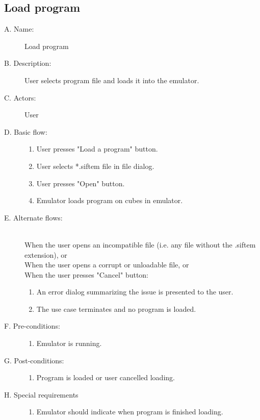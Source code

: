 \documentclass[12pt]{article}
\begin{document}
  \subsection{Load program}

    \begin{description}
      \item[A. Name:] Load program
      \item[B. Description:] User selects program file and loads it into the emulator.
      \item[C. Actors:] User
      \item[D. Basic flow:] \hfill 
        \begin{enumerate}
	  \item{User presses "Load a program" button.}
	  \item{User selects *.siftem file in file dialog.}
	  \item{User presses "Open" button.}
	  \item{Emulator loads program on cubes in emulator.}
        \end{enumerate}
      \item[E. Alternate flows:] \hfill \\
	When the user opens an incompatible file (i.e. any file without the .siftem extension), or \\
	When the user opens a corrupt or unloadable file, or \\
	When the user presses "Cancel" button:
        \begin{enumerate}
	  \item{An error dialog summarizing the issue is presented to the user.}
	  \item{The use case terminates and no program is loaded.}
        \end{enumerate}
      \item[F. Pre-conditions:] \hfill
        \begin{enumerate}
          \item{Emulator is running.}
        \end{enumerate}
      \item[G. Post-conditions:] \hfill
        \begin{enumerate}
	  \item{Program is loaded or user cancelled loading.}
        \end{enumerate}
      \item[H. Special requirements] \hfill
        \begin{enumerate}
          \item{Emulator should indicate when program is finished loading.}
        \end{enumerate}
    \end{description}
\end{document}
